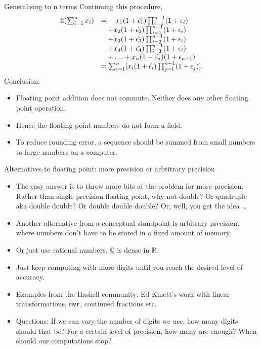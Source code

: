 \documentclass{beamer}
\begin{document}
\begin{frame}{Generalising to n terms}
Continuing this procedure,
\begin{equation*}
\begin{array}{rl}
\text{fl}(\sum_{i=1}^n x_i) &= \quad x_1 (1 + \hat{\epsilon_1}) \prod_{i=1}^{n-1} (1 + \epsilon_i) \\
&\quad + x_2 (1 + \hat{\epsilon_2}) \prod_{i=1}^{n-1} (1 + \epsilon_i) \\
&\quad + x_3 (1 + \hat{\epsilon_3}) \prod_{i=2}^{n-1} (1 + \epsilon_i) \\
&\quad + x_4 (1 + \hat{\epsilon_4}) \prod_{i=3}^{n-1} (1 + \epsilon_i) \\
&\quad + \ldots + x_n (1 + \hat{\epsilon_n}) (1 + \epsilon_{n-1}) \\
&= \sum_{i=1}^n [x_i (1 + \hat{\epsilon_i}) \prod_{j=1}^{n-1} (1 + \epsilon_j)].
\end{array}
\end{equation*}
Conclusion: 
\begin{itemize}
\item Floating point addition does not commute. Neither does any other floating point
			operation.
\item Hence the floating point numbers do not form a field.
\item To reduce rounding error, a sequence should be summed from small numbers to large numbers on a
computer.
\end{itemize}
\end{frame}


\begin{frame}{Alternatives to floating point: more precision or arbtitrary precision}
\begin{itemize}
\item The easy answer is to throw more bits at the problem for more precision. Rather than single precision 				floating point, why not double? Or quadruple aka double double? Or double double double? Or, well, you 				get the idea \ldots
\item Another alternative from a conceptual standpoint is arbitrary precision, where numbers don't have to be
			stored in a fixed amount of memory.
\item Or just use rational numbers. $\mathbb{Q}$ is dense in $\mathbb{R}$.
\item Just keep computing with more digits until you reach the desired level of accuracy.
\item Examples from the Haskell community: Ed Kmett's work with linear transformations, \texttt{mvr}, 
			continued fractions etc.
\item Questions: If we can vary the number of digits we use, how many digits should that be? For a certain
			level of precision, how many are enough? When should our computations stop?
\end{itemize}
\end{frame}
\end{document}
